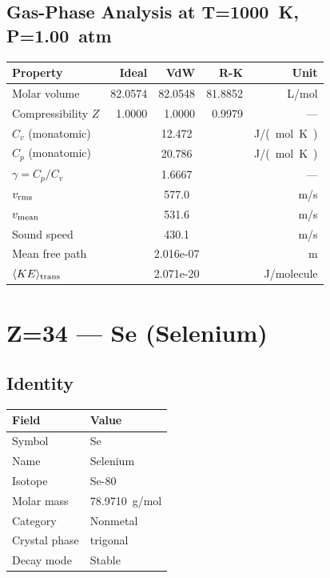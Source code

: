 \documentclass[11pt,a4paper]{article}
\begin{document}
\subsection{Gas-Phase Analysis at T=\SI{1000}{K}, P=\SI{1.00}{atm}}
\begin{tabular}{lrrrr}
  \toprule
  Property & Ideal & VdW & R-K & Unit \\
  \midrule
  Molar volume & 82.0574 & 82.0548 & 81.8852 & \si{L/mol} \\
  Compressibility $Z$ & 1.0000 & 1.0000 & 0.9979 & --- \\
  \midrule
  $C_v$ (monatomic) & \multicolumn{3}{c}{12.472} & \si{J/(mol.K)} \\
  $C_p$ (monatomic) & \multicolumn{3}{c}{20.786} & \si{J/(mol.K)} \\
  $\gamma = C_p/C_v$ & \multicolumn{3}{c}{1.6667} & --- \\
  $v_{\rm rms}$ & \multicolumn{3}{c}{577.0} & \si{m/s} \\
  $v_{\rm mean}$ & \multicolumn{3}{c}{531.6} & \si{m/s} \\
  Sound speed & \multicolumn{3}{c}{430.1} & \si{m/s} \\
  Mean free path & \multicolumn{3}{c}{2.016e-07} & \si{m} \\
  $\langle KE \rangle_{\rm trans}$ & \multicolumn{3}{c}{2.071e-20} & \si{J/molecule} \\
  \bottomrule
\end{tabular}

\newpage

\section{Z=34 --- Se (Selenium)}
\label{sec:Z34}

\subsection{Identity}
\begin{tabular}{ll}
  \toprule
  Field & Value \\
  \midrule
  Symbol & Se \\
  Name & Selenium \\
  Isotope & Se-80 \\
  Molar mass & \SI{78.9710}{g/mol} \\
  Category & Nonmetal \\
  Crystal phase & trigonal \\
  Decay mode & Stable \\
  \bottomrule
\end{tabular}
\end{document}
